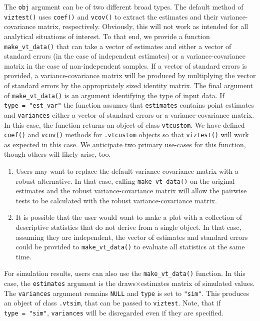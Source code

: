 The \texttt{obj} argument can be of two different broad types. The default method of \texttt{viztest()} uses \texttt{coef()} and \texttt{vcov()} to extract the estimates and their variance-covariance matrix, respectively. Obviously, this will not work as intended for all analytical situations of interest. To that end, we provide a function \texttt{make\_vt\_data()} that can take a vector of estimates and either a vector of standard errors (in the case of independent estimates) or a variance-covariance matrix in the case of non-independent samples. If a vector of standard errors is provided, a variance-covariance matrix will be produced by multiplying the vector of standard errors by the appropriately sized identity matrix. The final argument of \texttt{make\_vt\_data()} is an argument identifying the type of input data. If \texttt{type\ =\ "est\_var"} the function assumes that \texttt{estimates} contains point estimates and \texttt{variances} either a vector of standard errors or a variance-covariance matrix. In this case, the function returns an object of class \texttt{vtcustom}. We have defined \texttt{coef()} and \texttt{vcov()} methods for \texttt{.vtcustom} objects so that \texttt{viztest()} will work as expected in this case. We anticipate two primary use-cases for this function, though others will likely arise, too.

\begin{enumerate}
\def\labelenumi{\arabic{enumi}.}
\tightlist
\item
  Users may want to replace the default variance-covariance matrix with a robust alternative. In that case, calling \texttt{make\_vt\_data()} on the original estimates and the robust variance-covariance matrix will allow the pairwise tests to be calculated with the robust variance-covariance matrix.\\
\item
  It is possible that the user would want to make a plot with a collection of descriptive statistics that do not derive from a single object. In that case, assuming they are independent, the vector of estimates and standard errors could be provided to \texttt{make\_vt\_data()} to evaluate all statistics at the same time.
\end{enumerate}

For simulation results, users can also use the \texttt{make\_vt\_data()} function. In this case, the \texttt{estimates} argument is the draws\(\times\)estimates matrix of simulated values. The \texttt{variances} argument remains \texttt{NULL} and \texttt{type} is set to \texttt{"sim"}. This produces an object of class \texttt{.vtsim}, that can be passed to \texttt{viztest}. Note, that if \texttt{type\ =\ "sim"}, \texttt{variances} will be disregarded even if they are specified.

